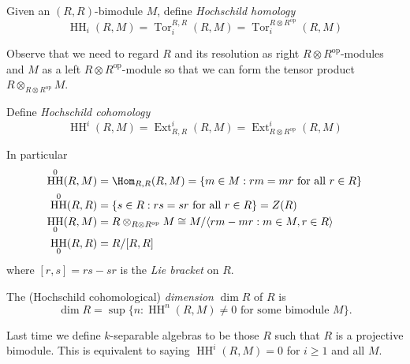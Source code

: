 \documentclass[a4paper]{article}
\DeclareMathOperator{\Tor}{Tor}
\DeclareMathOperator{\Ext}{Ext}
\newcommand{\op}{\mathrm{op}}
\DeclareMathOperator{\HH}{HH}
\begin{document}
\begin{definition}
  Given an \((R, R)\)-bimodule \(M\), define \emph{Hochschild homology}
  \[
    \HH_i(R, M) = \Tor_i^{R, R} (R, M) = \Tor_i^{R \otimes R^\op}(R, M)
  \]
\end{definition}
Observe that we need to regard \(R\) and its resolution as right \(R \otimes R^\op\)-modules and \(M\) as a left \(R \otimes R^\op\)-module so that we can form the tensor product \(R \otimes_{R \otimes R^\op} M\).

\begin{definition}
  Define \emph{Hochschild cohomology}
  \[
    \HH^i(R, M) = \Ext_{R, R}^i(R, M) = \Ext_{R \otimes R^\op}^i(R, M)
  \]
\end{definition}

In particular
\begin{align*}
  \HH^0(R, M) &= \Hom_{R, R} (R, M) = \{m \in M: rm = mr \text{ for all } r \in R\} \\
  \HH^0(R, R) &= \{s \in R: rs = sr \text{ for all } r \in R\} = Z(R) \\
  \HH_0(R, M) &= R \otimes_{R \otimes R^{\text{op}}} M \cong M / \langle rm - mr: m \in M, r \in R \rangle \\
  \HH_0(R, R) &= R/[R, R]
\end{align*}
where \([r, s] = rs - sr\) is the \emph{Lie bracket} on \(R\).

\begin{definition}
  The (Hochschild cohomological) \emph{dimension} \(\dim R\) of \(R\) is
  \[
    \dim R = \sup \{n: \HH^n(R, M) \neq 0 \text{ for some bimodule } M\}.
  \]
\end{definition}

\begin{remark}
  Last time we define \(k\)-separable algebras to be those \(R\) such that \(R\) is a projective bimodule. This is equivalent to saying \(\HH^i(R, M) = 0\) for \(i \geq 1\) and all \(M\).
\end{remark}
\end{document}
